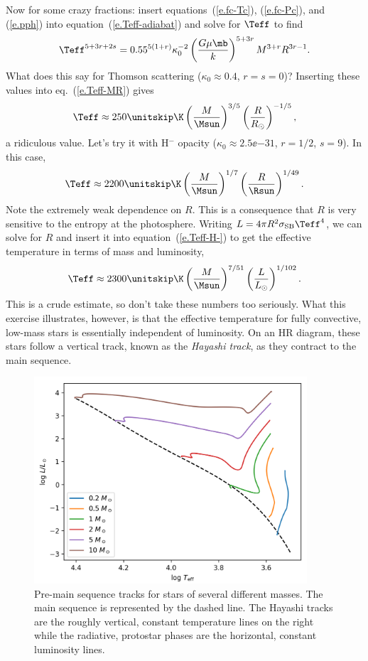 Now for some crazy fractions: insert equations~(\ref{e.fc-Tc}), (\ref{e.fc-Pc}), and (\ref{e.pph}) into equation~(\ref{e.Teff-adiabat}) and solve for $\Teff$ to find
\begin{equation}\label{e.Teff-MR}
\Teff^{5+3r+2s} = 0.55^{5(1+r)}\kappa_{0}^{-2} \left(\frac{G\mu\mb}{k}\right)^{5+3r}M^{3+r} R^{3r-1}.
\end{equation}
What does this say for Thomson scattering ($\kappa_{0} \approx 0.4$, $r=s=0$)? Inserting these values into eq.~(\ref{e.Teff-MR}) gives
\begin{equation}\label{e.Teff-th}
	\Teff \approx 250\nsp\K \left(\frac{M}{\Msun}\right)^{3/5}\left(\frac{R}{R_{\odot}}\right)^{-1/5},
\end{equation}
a ridiculous value. Let's try it with H$^{-}$ opacity ($\kappa_{0} \approx 2.5\ee{-31}$, $r=1/2$, $s=9$). In this case,
\begin{equation}\label{e.Teff-H-}
 \Teff \approx 2200\nsp\K \left(\frac{M}{\Msun}\right)^{1/7}\left(\frac{R}{\Rsun}\right)^{1/49}.
\end{equation}
Note the extremely weak dependence on $R$.  This is a consequence that $R$ is very sensitive to the entropy at the photosphere.  Writing $L = 4\pi R^{2}\ssb \Teff^{4}$, we can solve for $R$ and insert it into equation~(\ref{e.Teff-H-}) to get the effective temperature in terms of mass and luminosity,
\begin{equation}\label{e.Hayashi}
 \Teff \approx 2300\nsp\K \left(\frac{M}{\Msun}\right)^{7/51}\left(\frac{L}{L_{\odot}}\right)^{1/102}.
\end{equation}
This is a crude estimate, so don't take these numbers too seriously. What this exercise illustrates, however, is that the effective temperature for fully convective, low-mass stars is essentially independent of luminosity.  On an HR diagram, these stars follow a vertical track, known as the \emph{Hayashi track}, as they contract to the main sequence.

\begin{figure}[htbp]
  \includegraphics[width=4in]{star-formation/figs/hayashi}
  \caption{Pre-main sequence tracks for stars of several different masses. The main sequence is represented by the dashed line.
  The Hayashi tracks are the roughly vertical, constant temperature lines on the right while the radiative, protostar phases are the horizontal, constant luminosity lines.}\label{f.hayashi}
\end{figure}

